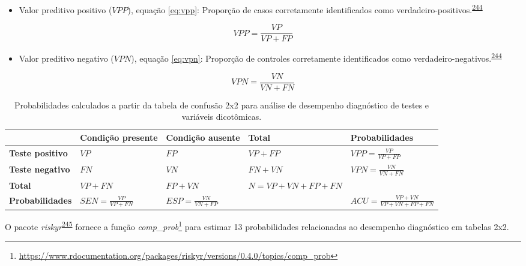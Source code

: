 \documentclass[
  a4paper,
]{book}
\providecommand{\tightlist}{%
  \setlength{\itemsep}{0pt}\setlength{\parskip}{0pt}}
\renewcommand{\href}[2]{#2\footnote{\url{#1}}}
\newenvironment{infobox}[1]
  {
  \begin{itemize}
  \renewcommand{\labelitemi}{
    \raisebox{-.7\height}[0pt][0pt]{
      {\setkeys{Gin}{width=3em,keepaspectratio}
        \texttt{[image: \#1]}}
    }
  }
  \setlength{\fboxsep}{1em}
  \begin{blackbox}
  \item
  }
  {
  \end{blackbox}
  \end{itemize}
  }
\begin{document}
\begin{itemize}
\tightlist
\item
  Valor preditivo positivo (\(VPP\)), equação \eqref{eq:vpp}: Proporção de casos corretamente identificados como verdadeiro-positivos.\textsuperscript{\protect\hyperlink{ref-greenhalgh1997b}{244}}
\end{itemize}

\begin{equation}
\label{eq:vpp}
VPP = \dfrac{VP}{VP+FP}
\end{equation}

\begin{itemize}
\tightlist
\item
  Valor preditivo negativo (\(VPN\)), equação \eqref{eq:vpn}: Proporção de controles corretamente identificados como verdadeiro-negativos.\textsuperscript{\protect\hyperlink{ref-greenhalgh1997b}{244}}
\end{itemize}

\begin{equation}
\label{eq:vpn}
VPN = \dfrac{VN}{VN+FN}
\end{equation}

\begin{table}

\caption{\label{tab:crosstable-prob}Probabilidades calculados a partir da tabela de confusão 2x2 para análise de desempenho diagnóstico de testes e variáveis dicotômicas.}
\centering
\begin{tabu} to 
\toprule
\textbf{ } & \textbf{Condição presente} & \textbf{Condição ausente} & \textbf{Total} & \textbf{Probabilidades}\\
\midrule
\textbf{Teste positivo} & $VP$ & $FP$ & $VP+FP$ & $VPP = \frac{VP}{VP+FP}$\\
\textbf{Teste negativo} & $FN$ & $VN$ & $FN+VN$ & $VPN = \frac{VN}{VN+FN}$\\
\textbf{Total} & $VP+FN$ & $FP+VN$ & $N=VP+VN+FP+FN$ & \\
\textbf{Probabilidades} & $SEN = \frac{VP}{VP+FN}$ & $ESP = \frac{VN}{VN+FP}$ &  & $ACU = \frac{VP+VN}{VP+VN+FP+FN}$\\
\bottomrule
\end{tabu}
\end{table}

\begin{infobox}{images/Rlogo}
O pacote \emph{riskyr}\textsuperscript{\protect\hyperlink{ref-riskyr}{245}} fornece a função \href{https://www.rdocumentation.org/packages/riskyr/versions/0.4.0/topics/comp_prob}{\emph{comp\_prob}} para estimar 13 probabilidades relacionadas ao desempenho diagnóstico em tabelas 2x2.

\end{infobox}
\end{document}
